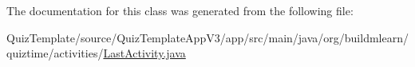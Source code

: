 The documentation for this class was generated from the following file\+:\begin{DoxyCompactItemize}
\item 
Quiz\+Template/source/\+Quiz\+Template\+App\+V3/app/src/main/java/org/buildmlearn/quiztime/activities/\hyperlink{QuizTemplate_2source_2QuizTemplateAppV3_2app_2src_2main_2java_2org_2buildmlearn_2quiztime_2activities_2LastActivity_8java}{Last\+Activity.\+java}\end{DoxyCompactItemize}
